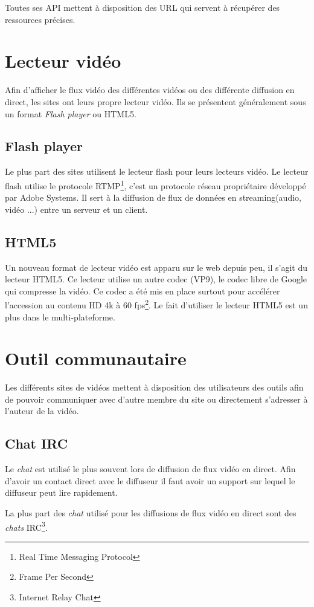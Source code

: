 \documentclass[11pt]{report} %
\begin{document}
		Toutes ses API mettent à disposition des URL qui servent à récupérer des ressources précises. 
		
		
	\section{Lecteur vidéo}
	Afin d'afficher le flux vidéo des différentes vidéos ou des différente diffusion en direct, les sites ont leurs propre lecteur vidéo.
	Ils se présentent généralement sous un format \textit{Flash player} ou HTML5.
	
		\subsection{Flash player}
		Le plus part des sites utilisent le lecteur flash pour leurs lecteurs vidéo. Le lecteur flash utilise le protocole RTMP\footnote{Real Time Messaging Protocol}, c'est un protocole réseau propriétaire développé par Adobe Systems. Il sert à la diffusion de flux de données en streaming(audio, vidéo ...) entre un serveur et un client.
		
		\subsection{HTML5}
		Un nouveau format de lecteur vidéo est apparu sur le web depuis peu, il s'agit du lecteur HTML5. Ce lecteur utilise un autre codec (VP9), le codec libre de Google qui compresse la vidéo. Ce codec a été mis en place surtout pour accélérer l'accession au contenu HD 4k à 60 fps\footnote{Frame Per Second}.
		Le fait d'utiliser le lecteur HTML5 est un plus dans le multi-plateforme.
	
	\section{Outil communautaire}
	Les différents sites de vidéos mettent à disposition des utilisateurs des outils afin de pouvoir communiquer avec d'autre membre du site ou directement s'adresser à l'auteur de la vidéo.
		\subsection{Chat IRC}
		\label{chat}
		Le \textit{chat} est utilisé le plus souvent lors de diffusion de flux vidéo en direct. Afin d'avoir un contact direct avec le diffuseur il faut avoir un support sur lequel le diffuseur peut lire rapidement.
		
		La plus part des \textit{chat} utilisé pour les diffusions de flux vidéo en direct sont des \textit{chats} IRC\footnote{Internet Relay Chat}.
		
\end{document}
